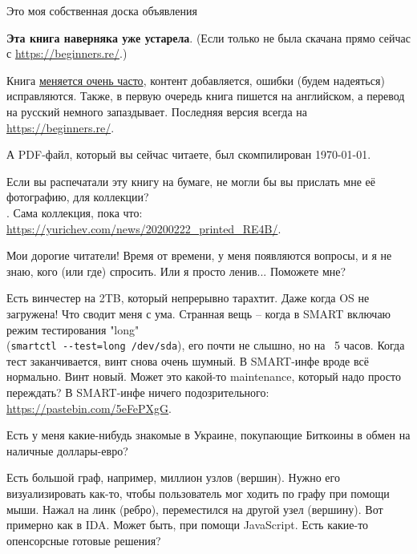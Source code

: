 
\begin{center}
\LARGE{} Это моя собственная доска объявления \normalsize{}
\end{center}

\textbf{Эта книга наверняка уже устарела}.
(Если только не была скачана прямо сейчас с \url{https://beginners.re/}.)

Книга \href{\RepoURL/ChangeLog}{меняется очень часто},
контент добавляется, ошибки (будем надеяться) исправляются.
Также, в первую очередь книга пишется на английском, а перевод на русский немного запаздывает.
Последняя версия всегда на \url{https://beginners.re/}.

А PDF-файл, который вы сейчас читаете, был скомпилирован \today{}.

\myhrule{}

Если вы распечатали эту книгу на бумаге, не могли бы вы прислать мне её фотографию, для коллекции?\\
\EMAILS{}.
Сама коллекция, пока что: \url{https://yurichev.com/news/20200222_printed_RE4B/}.

\myhrule{}

Мои дорогие читатели! Время от времени, у меня появляются вопросы, и я не знаю, кого (или где) спросить.
Или я просто ленив...
Поможете мне?

\myhrule{}

Есть винчестер на 2TB, который непрерывно тарахтит.
Даже когда OS не загружена!
Что сводит меня с ума.
Странная вещь -- когда в SMART включаю режим тестирования "long" \\
(\verb|smartctl --test=long /dev/sda|),
его почти не слышно, но на ~5 часов.
Когда тест заканчивается, винт снова очень шумный.
В SMART-инфе вроде всё нормально.
Винт новый.
Может это какой-то maintenance, который надо просто переждать?
В SMART-инфе ничего подозрительного: \url{https://pastebin.com/5eFePXgG}.

\myhrule{}

Есть у меня какие-нибудь знакомые в Украине, покупающие Биткоины в обмен на наличные доллары-евро?

\myhrule{}

Есть большой граф, например, миллион узлов (вершин).
Нужно его визуализировать как-то, чтобы пользователь мог ходить по графу при помощи мыши.
Нажал на линк (ребро), переместился на другой узел (вершину).
Вот примерно как в IDA.
Может быть, при помощи JavaScript.
Есть какие-то опенсорсные готовые решения?

